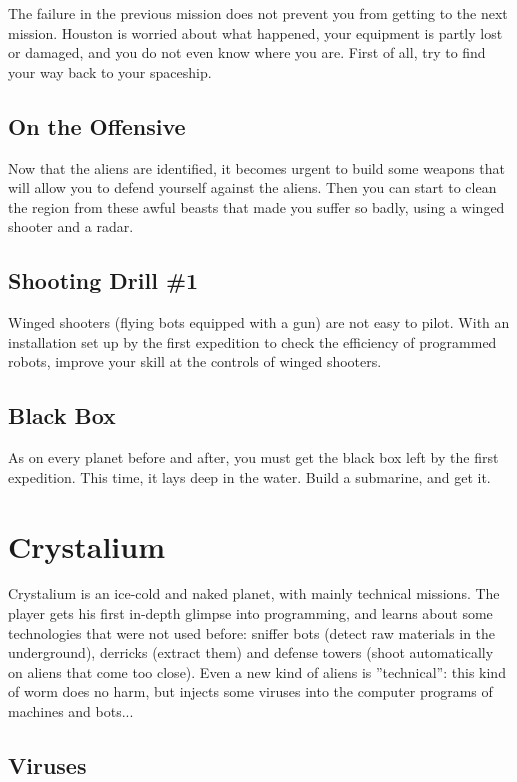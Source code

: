 The failure in the previous mission does not prevent you from getting to the next mission. Houston is worried about what happened, your equipment is partly lost or damaged, and you do not even know where you are. First of all, try to find your way back to your spaceship.


\subsection{On the Offensive}

Now that the aliens are identified, it becomes urgent to build some weapons that will allow you to defend yourself against the aliens. Then you can start to clean the region from these awful beasts that made you suffer so badly, using a winged shooter and a radar.


\subsection{Shooting Drill \#1}

Winged shooters (flying bots equipped with a gun) are not easy to pilot. With an installation set up by the first expedition to check the efficiency of programmed robots, improve your skill at the controls of winged shooters.


\subsection{Black Box}

As on every planet before and after, you must get the black box left by the first expedition. This time, it lays deep in the water. Build a submarine, and get it.


\newpage
\section{Crystalium}

Crystalium is an ice-cold and naked planet, with mainly technical missions. The player gets his first in-depth glimpse into programming, and learns about some technologies that were not used before: sniffer bots (detect raw materials in the underground), derricks (extract them) and defense towers (shoot automatically on aliens that come too close). Even a new kind of aliens is ''technical'': this kind of worm does no harm, but injects some viruses into the computer programs of machines and bots...


\subsection{Viruses}

